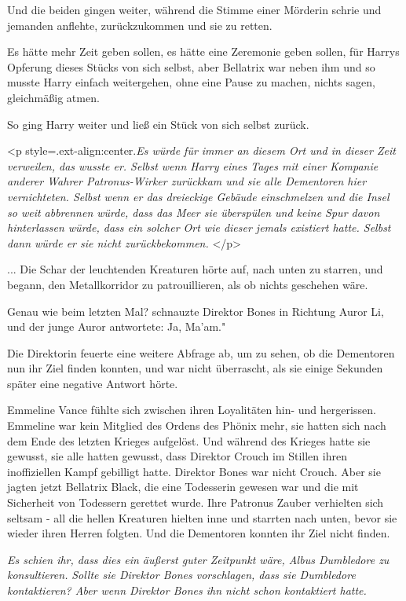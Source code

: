 Und die beiden gingen weiter, während die Stimme einer Mörderin schrie und
jemanden anflehte, zurückzukommen und sie zu retten.

Es hätte mehr Zeit geben sollen, es hätte eine Zeremonie geben sollen, für
Harrys Opferung dieses Stücks von sich selbst, aber Bellatrix war neben ihm und
so musste Harry einfach weitergehen, ohne eine Pause zu machen, nichts sagen,
gleichmäßig atmen.

So ging Harry weiter und ließ ein Stück von sich selbst zurück.

<p style=\grqq{}.ext-align:center\grqq{}.\emph{Es würde für immer an diesem Ort
und in dieser Zeit verweilen, das wusste er. Selbst wenn Harry eines Tages mit
einer Kompanie anderer Wahrer Patronus-Wirker zurückkam und sie alle Dementoren
hier vernichteten. Selbst wenn er das dreieckige Gebäude einschmelzen und die
Insel so weit abbrennen würde, dass das Meer sie überspülen und keine Spur davon
hinterlassen würde, dass ein solcher Ort wie dieser jemals existiert hatte.
Selbst dann würde er sie nicht zurückbekommen. }</p>

... Die Schar der leuchtenden Kreaturen hörte auf, nach unten zu starren, und
begann, den Metallkorridor zu patrouillieren, als ob nichts geschehen wäre.

\glqq Genau wie beim letzten Mal?\grqq{} schnauzte Direktor Bones in Richtung
Auror Li, und der junge Auror antwortete: \glqq Ja, Ma'am."

Die Direktorin feuerte eine weitere Abfrage ab, um zu sehen, ob die Dementoren
nun ihr Ziel finden konnten, und war nicht überrascht, als sie einige Sekunden
später eine negative Antwort hörte.

Emmeline Vance fühlte sich zwischen ihren Loyalitäten hin- und hergerissen.
Emmeline war kein Mitglied des Ordens des Phönix mehr, sie hatten sich nach dem
Ende des letzten Krieges aufgelöst. Und während des Krieges hatte sie gewusst,
sie alle hatten gewusst, dass Direktor Crouch im Stillen ihren inoffiziellen
Kampf gebilligt hatte. Direktor Bones war nicht Crouch. Aber sie jagten jetzt
Bellatrix Black, die eine Todesserin gewesen war und die mit Sicherheit von
Todessern gerettet wurde. Ihre Patronus Zauber verhielten sich seltsam - all die
hellen Kreaturen hielten inne und starrten nach unten, bevor sie wieder ihren
Herren folgten. Und die Dementoren konnten ihr Ziel nicht finden.

\emph{Es schien ihr, dass dies ein äußerst guter Zeitpunkt wäre, Albus
Dumbledore zu konsultieren.} \emph{Sollte sie Direktor Bones vorschlagen, dass
sie Dumbledore kontaktieren? Aber wenn Direktor Bones ihn nicht schon
kontaktiert hatte.}


